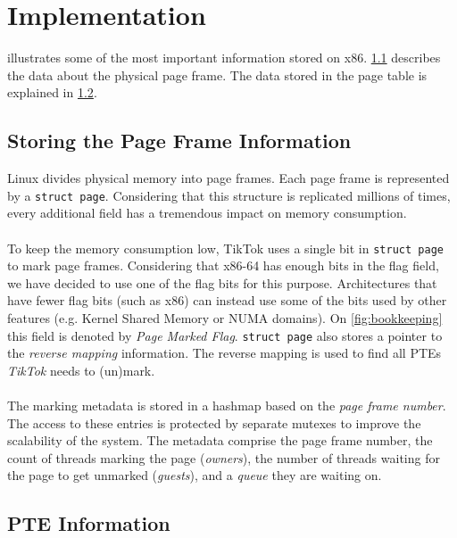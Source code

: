 \section{Implementation}
\label{sec:implementation}

 illustrates some of the most important information stored
on x86. \cref{subsec:frameinfo} describes the data about the physical page
frame. The data stored in the page table is explained in \cref{subsec:pageinfo}.

\subsection{Storing the Page Frame Information}
\label{subsec:frameinfo}
Linux divides physical memory into page frames. Each page frame is represented
by a \texttt{struct page}. Considering that this structure is replicated
millions of times, every additional field has a tremendous impact on memory
consumption.
\\
\\
To keep the memory consumption low, TikTok uses a single bit in \texttt{struct
page} to mark page frames. Considering that x86-64 has enough bits in the flag
field, we have decided to use one of the flag bits for this purpose.
Architectures that have fewer flag bits (such as x86) can instead use some of
the bits used by other features (e.g. Kernel Shared Memory or NUMA domains). On
\cref{fig:bookkeeping} this field is denoted by \emph{Page Marked Flag}.
\texttt{struct page} also stores a pointer to the \emph{reverse mapping}
information. The reverse mapping is used to find all PTEs \emph{TikTok} needs to
(un)mark.
\\
\\
The marking metadata is stored in a hashmap based on the \emph{page frame
number}. The access to these entries is protected by separate mutexes to improve
the scalability of the system. The metadata comprise the page frame number, the
count of threads marking the page (\emph{owners}), the number of threads waiting
for the page to get unmarked (\emph{guests}), and a \emph{queue} they are
waiting on. 

\subsection{PTE Information}
\label{subsec:pageinfo}

